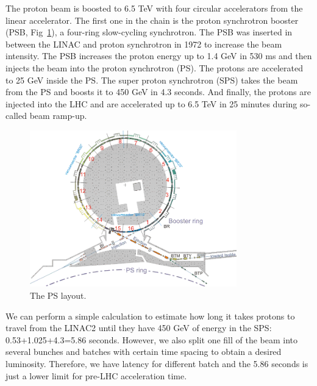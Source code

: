 The proton beam is boosted to 6.5 TeV with four circular accelerators from the linear accelerator. The first one in the chain is the proton synchrotron booster (PSB, Fig~\ref{fig:c3lhcpsb}), a four-ring slow-cycling synchrotron. The PSB was inserted in between the LINAC and proton synchrotron in 1972 to increase the beam intensity. The PSB increases the proton energy up to 1.4 GeV in 530 ms and then injects the beam into the proton synchrotron (PS). The protons are accelerated to 25 GeV inside the PS. The super proton synchrotron (SPS) takes the beam from the PS and boosts it to 450 GeV in 4.3 seconds. And finally, the protons are injected into the LHC and are accelerated up to 6.5 TeV in 25 minutes during so-called beam ramp-up. 

\begin{figure}[htbp]
 \begin{center}
  \includegraphics[width=0.8\textwidth]{figures/c3/c3_lhc_psb.png}
 \end{center}
 \caption{The PS layout.}
 \label{fig:c3lhcpsb}
\end{figure}

We can perform a simple calculation to estimate how long it takes protons to travel from the LINAC2 until they have 450 GeV of energy in the SPS: 0.53+1.025+4.3=5.86 seconds. However, we also split one fill of the beam into several bunches and batches with certain time spacing to obtain a desired luminosity. Therefore, we have latency for different batch and the 5.86 seconds is just a lower limit for pre-LHC acceleration time. 


